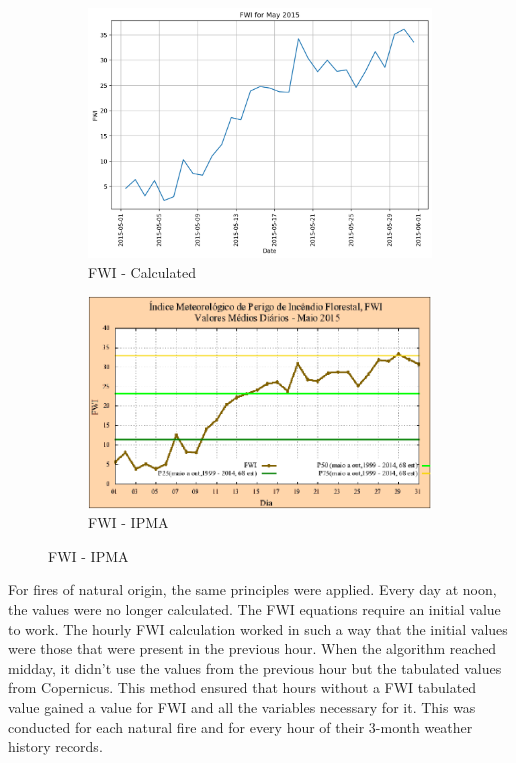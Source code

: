 \begin{figure}[H]
	\caption{Comparison of average FWI calculated values and IPMA - 2015}
	\centering
	\begin{subfigure}{0.49\textwidth}
		\centering
		\includegraphics[width=\textwidth]{chapter-images/Datasetcreation/FWI/fwi_X1_plot.png}
		\caption{FWI - Calculated}
		\label{fig:fwi_copernicus_2022_midday}
	\end{subfigure}
	\hfill
	\begin{subfigure}{0.49\textwidth}
		\centering
		\includegraphics[width=\textwidth]{chapter-images/Datasetcreation/FWI/fwi_ipma.png}
		\caption{FWI - IPMA}
		\label{fig:fwi_calculated_2022_midday}
	\end{subfigure}
	\label{fig:comparison_fwi_ipma}
\end{figure}


For fires of natural origin, the same principles were applied. Every day at noon, the values were no longer calculated. The FWI equations require an initial value to work. The hourly FWI calculation worked in such a way that the initial values were those that were present in the previous hour. When the algorithm reached midday, it didn't use the values from the previous hour but the tabulated values from Copernicus. This method ensured that hours without a FWI tabulated value gained a value for FWI and all the variables necessary for it. This was conducted for each natural fire and for every hour of their 3-month weather history records.

